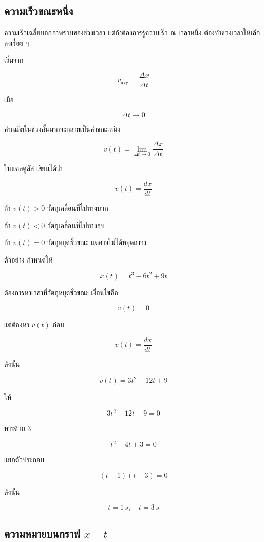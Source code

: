 \subsection{ความเร็วขณะหนึ่ง}

ความเร็วเฉลี่ยบอกภาพรวมของช่วงเวลา แต่ถ้าต้องการรู้ความเร็ว ณ เวลาหนึ่ง ต้องทำช่วงเวลาให้เล็กลงเรื่อย ๆ

เริ่มจาก

\[
v_{\text{avg}}=\frac{\Delta x}{\Delta t}
\]

เมื่อ

\[
\Delta t\to 0
\]

ค่าเฉลี่ยในช่วงสั้นมากจะกลายเป็นค่าขณะหนึ่ง

\[
v(t)=\lim_{\Delta t\to 0}\frac{\Delta x}{\Delta t}
\]

ในแคลคูลัส เขียนได้ว่า

\[
v(t)=\frac{dx}{dt}
\]

\begin{tcolorbox}[title=การแปลความหมายของเครื่องหมาย]
ถ้า $v(t)>0$ วัตถุเคลื่อนที่ไปทางบวก

ถ้า $v(t)<0$ วัตถุเคลื่อนที่ไปทางลบ

ถ้า $v(t)=0$ วัตถุหยุดชั่วขณะ แต่อาจไม่ได้หยุดถาวร
\end{tcolorbox}

\begin{examplebox}{ตัวอย่าง}
กำหนดให้

\[
x(t)=t^3-6t^2+9t
\]

ต้องการหาเวลาที่วัตถุหยุดชั่วขณะ เงื่อนไขคือ

\[
v(t)=0
\]

แต่ต้องหา $v(t)$ ก่อน

\[
v(t)=\frac{dx}{dt}
\]

ดังนั้น

\[
v(t)=3t^2-12t+9
\]

ให้

\[
3t^2-12t+9=0
\]

หารด้วย $3$

\[
t^2-4t+3=0
\]

แยกตัวประกอบ

\[
(t-1)(t-3)=0
\]

ดังนั้น

\[
t=1\,\si{s},\quad t=3\,\si{s}
\]
\end{examplebox}

\subsection{ความหมายบนกราฟ $x-t$}


